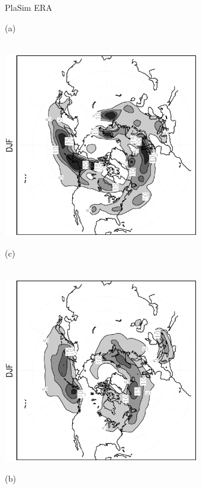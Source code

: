 \documentclass[12pt,a4paper,twoside,openright,headinclude,liststotoc,bibtotoc]{scrreprt}
\begin{document}
\begin{figure}[b]
\hspace{3.8cm}PlaSim \vspace{0.2cm} \hspace{7.3cm} ERA \\
\parbox{8.5cm}{\hspace{0.95cm}\begin{scriptsize}(a)\end{scriptsize} \vspace{-0.5cm} \\
\includegraphics[height=8.0cm,angle=-90]
{eps/cycldensity_PLASIM_T21_45DJF.eps}
}
\parbox{8.5cm}{\hspace{0.95cm}\begin{scriptsize}(c)\end{scriptsize} \vspace{-0.5cm} \\
\includegraphics[height=8.0cm,angle=-90]
{eps/cycldensity_ERA40_T21_45DJF.eps}
}
\parbox{8.5cm}{\hspace{0.95cm}\begin{scriptsize}(b)\end{scriptsize} \vspace{-0.5cm} \\
}
\end{figure}
\end{document}
